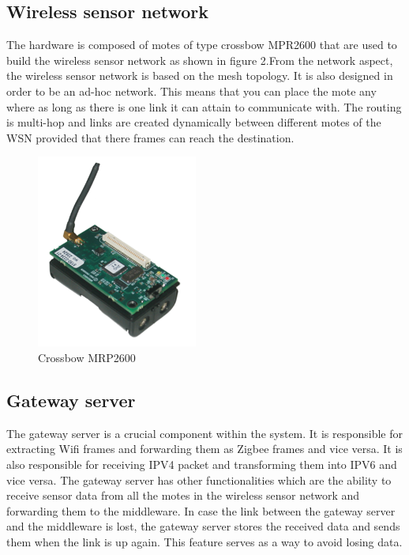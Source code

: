 \documentclass[conference]{IEEEtran}
\begin{document}
\subsection{Wireless sensor network}
The hardware is composed of motes of type crossbow MPR2600 that are used to build the wireless sensor network as shown in figure 2.From the network aspect, the wireless sensor network is based on the mesh topology. It is also designed in order to be an ad-hoc network. This means that you can place the mote any where as long as there is one link it can attain to communicate with. The routing is multi-hop and links are created dynamically between different motes of the WSN provided that there frames can reach the destination.

\begin{figure}[htbp]
\centering
\includegraphics[scale=0.5]{images/micaz.png}
\caption{Crossbow MRP2600}
\label{fig:micaz}
\end{figure}

\subsection{Gateway server}
The gateway server is a crucial component within the system. It is responsible for extracting Wifi frames and forwarding them as Zigbee frames and vice versa. It is also responsible for receiving IPV4 packet and transforming them into IPV6 and vice versa. The gateway server has other functionalities which are the ability to receive sensor data from all the motes in the wireless sensor network and forwarding them to the middleware. In case the link between the gateway server and the middleware is lost, the gateway server stores the received data and sends them when the link is up again. This feature serves as a way to avoid losing data.
\end{document}
